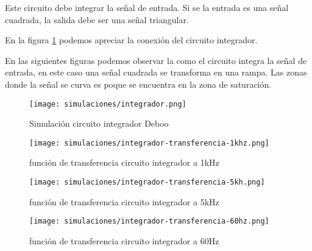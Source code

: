 Este circuito debe integrar la señal de entrada. Si se la entrada es una señal cuadrada, la salida debe ser una señal triangular.

En la figura \ref{fig:sim-integrador} podemos apreciar la conexión del circuito integrador.

En las siguientes figuras podemos observar la como el circuito integra la señal de entrada, en este caso una señal cuadrada se transforma en una rampa. Las zonas donde la señal se curva es poque se encuentra en la zona de saturación.

\begin{figure}[ht]
    \centering
    \texttt{[image: simulaciones/integrador.png]}
    \caption{Simulación circuito integrador Deboo}
    \label{fig:sim-integrador}
\end{figure}

\begin{figure}[ht]
    \centering
    \texttt{[image: simulaciones/integrador-transferencia-1khz.png]}
    \caption{función de transferencia circuito integrador a 1kHz}
    \label{fig:sim-integrador-1k}
\end{figure}

\begin{figure}[ht]
    \centering
    \texttt{[image: simulaciones/integrador-transferencia-5kh.png]}
    \caption{función de transferencia circuito integrador a 5kHz}
    \label{fig:sim-integrador-5k}
\end{figure}

\begin{figure}[ht]
    \centering
    \texttt{[image: simulaciones/integrador-transferencia-60hz.png]}
    \caption{función de transferencia circuito integrador a 60Hz}
    \label{fig:sim-integrador-60}
\end{figure}